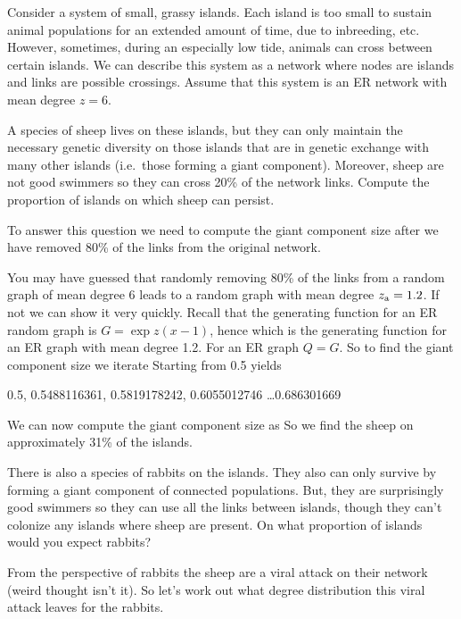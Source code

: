 
Consider a system of small, grassy islands. Each island is too 
small to sustain animal populations for an extended amount of time, due to inbreeding, etc. However, sometimes, during an especially low tide, animals can cross between certain islands. We can describe this system as a network where nodes are islands and links are possible crossings. Assume that this system is an ER network with mean degree $z=6$.

\subquestion A species of sheep lives on these islands, but they can only maintain the necessary genetic diversity on those islands that are in genetic exchange with many other islands (i.e.~those forming a giant component). Moreover, sheep are not good swimmers so they can cross 20\% of the network links. Compute the proportion of islands on which sheep can persist.  

\solution
To answer this question we need to compute the giant component size after we have removed 80\% of the links from the original network.

You may have guessed that randomly removing 80\% of the links from a random graph of mean degree $6$ leads to a random graph with mean degree $z_{\rm a}=  1.2$. If not we can show it very quickly. Recall that the generating function for an ER random graph is $G=\exp{z(x-1)}$, hence
which is the generating function for an ER graph with mean degree 1.2. For an ER graph $Q=G$. So to find the giant component size we iterate
Starting from 0.5 yields
\begin{center}
0.5, 0.5488116361, 0.5819178242, 0.6055012746 \ldots 0.686301669 
\end{center}
We can now compute the giant component size as
So we find the sheep on approximately 31\% of the islands.

\subquestion There is also a species of rabbits on the islands. They also can only survive by forming a giant component of connected populations. But, they are surprisingly good swimmers so they can use all the links between islands, though they can't colonize any islands where sheep are present. On what proportion of islands would you expect rabbits?

\solution 
From the perspective of rabbits the sheep are a viral attack on their network (weird thought isn't it). So let's work out what degree distribution this viral attack leaves for the rabbits. 

